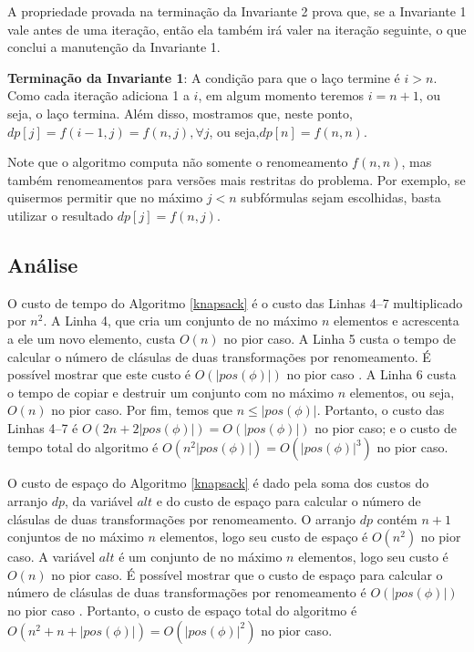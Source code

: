A propriedade provada na terminação da Invariante 2 prova que, se a Invariante 1 vale antes de uma iteração, então ela também irá valer na iteração seguinte, o que conclui a manutenção da Invariante 1.

\textbf{Terminação da Invariante 1}: A condição para que o laço termine é $i > n$. Como cada iteração adiciona 1 a $i$, em algum momento teremos $i = n+1$, ou seja, o laço termina. Além disso, mostramos que, neste ponto, $dp[j] = f(i-1,j) = f(n,j), \forall j$, ou seja,\break $dp[n] = f(n,n)$.

Note que o algoritmo computa não somente o renomeamento $f(n,n)$, mas também renomeamentos para versões mais restritas do problema. Por exemplo, se quisermos permitir que no máximo $j < n$ subfórmulas sejam escolhidas, basta utilizar o resultado $dp[j] = f(n,j)$.

\subsection{Análise}

\indent

O custo de tempo do Algoritmo \ref{knapsack} é o custo das Linhas 4--7 multiplicado por $n^2$. A Linha 4, que cria um conjunto de no máximo $n$ elementos e acrescenta a ele um novo elemento, custa $O(n)$ no pior caso. A Linha 5 custa o tempo de calcular o número de clásulas de duas transformações por renomeamento. É possível mostrar que este custo é $O(|pos(\phi)|)$ no pior caso \cite{nonnengart2001computing}. A Linha 6 custa o tempo de copiar e destruir um conjunto com no máximo $n$ elementos, ou seja, $O(n)$ no pior caso. Por fim, temos que $n \leq |pos(\phi)|$. Portanto, o custo das Linhas 4--7 é $O(2n + 2|pos(\phi)|) = O(|pos(\phi)|)$ no pior caso; e o custo de tempo total do algoritmo é $O(n^2 |pos(\phi)|) = O(|pos(\phi)|^3)$ no pior caso.

O custo de espaço do Algoritmo \ref{knapsack} é dado pela soma dos custos do arranjo $dp$, da variável $alt$ e do custo de espaço para calcular o número de clásulas de duas transformações por renomeamento. O arranjo $dp$ contém $n+1$ conjuntos de no máximo $n$ elementos, logo seu custo de espaço é $O(n^2)$ no pior caso. A variável $alt$ é um conjunto de no máximo $n$ elementos, logo seu custo é $O(n)$ no pior caso. É possível mostrar que o custo de espaço para calcular o número de clásulas de duas transformações por renomeamento é $O(|pos(\phi)|)$ no pior caso \cite{nonnengart2001computing}. Portanto, o custo de espaço total do algoritmo é\break $O(n^2 + n + |pos(\phi)|) = O(|pos(\phi)|^2)$ no pior caso.

